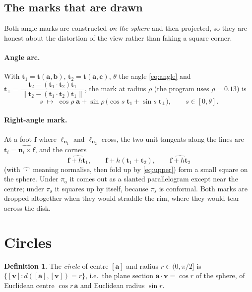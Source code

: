 \documentclass[11pt,a4paper]{article}
\newcommand{\proj}[1]{\pi_{\mathrm{#1}}}
\newcommand{\po}{\proj{o}}
\newcommand{\ps}{\proj{s}}
\newcommand{\nvec}{\mathbf{n}}
\newcommand{\vv}{\mathbf{v}}
\newcommand{\aaa}{\mathbf{a}}
\newcommand{\bb}{\mathbf{b}}
\newcommand{\cc}{\mathbf{c}}
\newcommand{\tvec}{\mathbf{t}}
\newcommand{\norm}[1]{\lVert #1 \rVert}
\theoremstyle{plain}
\theoremstyle{definition}
\newtheorem{definition}[proposition]{Definition}
\theoremstyle{remark}
\begin{document}
\subsection{The marks that are drawn}

Both angle marks are constructed \emph{on the sphere} and then projected, so
they are honest about the distortion of the view rather than faking a square
corner.

\paragraph{Angle arc.} With $\tvec_1=\tvec(\aaa,\bb)$, $\tvec_2=\tvec(\aaa,\cc)$,
$\theta$ the angle \eqref{eq:angle} and
$\tvec_{\perp}=\dfrac{\tvec_2-(\tvec_1\cdot\tvec_2)\tvec_1}
                     {\norm{\tvec_2-(\tvec_1\cdot\tvec_2)\tvec_1}}$,
the mark at radius $\rho$ (the program uses $\rho=0.13$) is
\begin{equation}
  s\;\longmapsto\;\cos\rho\;\aaa+\sin\rho\,\bigl(\cos s\;\tvec_1+\sin s\;\tvec_{\perp}\bigr),
  \qquad s\in[0,\theta].
\end{equation}

\paragraph{Right-angle mark.} At a foot $\mathbf{f}$ where $\ell_{\nvec_1}$ and
$\ell_{\nvec_2}$ cross, the two unit tangents along the lines are
$\tvec_i=\widehat{\nvec_i\times\mathbf{f}}$, and the corners
\begin{equation}
  \widehat{\mathbf{f}+h\tvec_1},\qquad
  \widehat{\mathbf{f}+h(\tvec_1+\tvec_2)},\qquad
  \widehat{\mathbf{f}+h\tvec_2}
\end{equation}
(with $\widehat{\;\cdot\;}$ meaning normalise, then fold up by
\eqref{eq:upper}) form a small square on the sphere. Under $\po$ it comes out as
a slanted parallelogram except near the centre; under $\ps$ it squares up by
itself, because $\ps$ is conformal. Both marks are dropped altogether when they
would straddle the rim, where they would tear across the disk.

\section{Circles}

\begin{definition}
The \emph{circle} of centre $[\aaa]$ and radius $r\in(0,\pi/2]$ is
$\{[\vv]:d([\aaa],[\vv])=r\}$, i.e.\ the plane section
$\aaa\cdot\vv=\cos r$ of the sphere, of Euclidean centre $\cos r\,\aaa$ and
Euclidean radius $\sin r$.
\end{definition}
\end{document}
